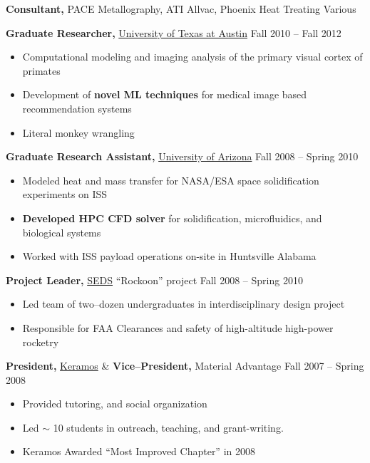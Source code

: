 \documentclass{res}
\begin{document}
\begin{resume}
{\bf Consultant,} PACE Metallography, ATI Allvac, Phoenix Heat Treating \hfill Various

{\bf Graduate Researcher,} \href{https://www.utexas.edu/}{University of Texas at Austin} \hfill
Fall 2010 -- Fall 2012
\begin{itemize} \itemsep -2pt
  \item Computational modeling and imaging analysis of the primary visual cortex of primates
  \item Development of \textbf{novel ML techniques} for medical image based recommendation systems
  \item Literal monkey wrangling
\end{itemize}

{\bf Graduate Research Assistant,} \href{https://www.arizona.edu/}{University of Arizona} \hfill
Fall 2008 -- Spring 2010
\begin{itemize} \itemsep -2pt
  \item Modeled heat and mass transfer for NASA/ESA space solidification experiments on ISS
  \item \textbf{Developed HPC CFD solver} for solidification, microfluidics, and biological systems
  \item Worked with ISS payload operations on-site in Huntsville Alabama 
\end{itemize}

{\bf Project Leader,}  \href{https://seds.arizona.edu/}{SEDS} ``Rockoon''  project \hfill   Fall 2008 -- Spring 2010
\begin{itemize} \itemsep -2pt
  \item Led team of two--dozen undergraduates in interdisciplinary design project
  \item Responsible for FAA Clearances and safety of high-altitude high-power rocketry
\end{itemize}

{\bf President,} \href{https://ceramics.org/members/member-communities/classes/keramos}{Keramos} \& {\bf Vice--President,} Material Advantage \hfill Fall 2007 -- Spring 2008
\begin{itemize} \itemsep -2pt
  \item Provided tutoring, and social organization
  \item Led $\sim$ 10 students in outreach, teaching, and grant-writing.
  \item Keramos Awarded ``Most Improved Chapter'' in 2008
\end{itemize}


\end{resume}
\end{document}
